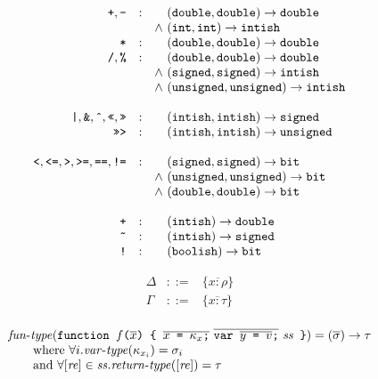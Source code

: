 \documentclass{article}
\newcommand{\funtype}{\mathit{fun}\mbox{-}\mathit{type}}
\newcommand{\vartype}{\mathit{var}\mbox{-}\mathit{type}}
\newcommand{\rettype}{\mathit{return}\mbox{-}\mathit{type}}
\newcommand{\funty}[2]{({#1}) \rightarrow {#2}}
\newcommand{\seq}[1]{\overline{{#1}}}
\newcommand{\mathjs}[1]{\mbox{\texttt{{#1}}}}
\newcommand{\fun}[3]{\mathjs{function }{#1}\mathjs{(}{#2}\mathjs{) \char123{} }{#3}\mathjs{ \char125{}}}
\newcommand{\var}[1]{\mathjs{var }{#1}\mathjs{;}}
\newcommand{\bit}{\mathtt{bit}}
\newcommand{\unsigned}{\mathtt{unsigned}}
\newcommand{\signed}{\mathtt{signed}}
\newcommand{\double}{\mathtt{double}}
\renewcommand{\int}{\mathtt{int}}
\newcommand{\boolish}{\mathtt{boolish}}
\newcommand{\intish}{\mathtt{intish}}
\begin{document}
\[
\begin{array}{rcc@{\ }l}
\mathjs{+}, \mathjs{-}
                 & : &       & \funty{\double, \double}{\double} \\
                 &   & \land & \funty{\int, \int}{\intish} \\
\mathjs{*}       & : &       & \funty{\double, \double}{\double} \\
\mathjs{/}, \mathjs{\%}
                 & : &       & \funty{\double, \double}{\double} \\
                 &   & \land & \funty{\signed, \signed}{\intish}  \\
                 &   & \land & \funty{\unsigned, \unsigned}{\intish} \\
\\
\mathjs{|}, \mathjs{\&}, \mathjs{\^{}}, \mathjs{<<}, \mathjs{>>}
                 & : &       & \funty{\intish, \intish}{\signed} \\
\mathjs{>>>}     & : &       & \funty{\intish, \intish}{\unsigned} \\
\\
\mathjs{<}, \mathjs{<=}, \mathjs{>}, \mathjs{>=}, \mathjs{==}, \mathjs{!=}
                 & : &       & \funty{\signed, \signed}{\bit} \\
                 &   & \land & \funty{\unsigned, \unsigned}{\bit} \\
                 &   & \land & \funty{\double, \double}{\bit} \\
\\
\mathjs{+}       & : &       & \funty{\intish}{\double} \\
\mathjs{\~{}}    & : &       & \funty{\intish}{\signed} \\
\mathjs{!}       & : &       & \funty{\boolish}{\bit} \\
\end{array}
\]

\[
\begin{array}{rcl}
\Delta & ::= & \{ \seq{x : \rho} \} \\
\Gamma & ::= & \{ \seq{x : \tau} \} \\
\end{array}
\]

\[
\begin{array}{l}
\funtype(\fun{f}{\seq{x}}{\seq{x\mathjs{ = }\kappa_x\mathjs{;}}\ \seq{\var{\seq{y\mathjs{ = }v}}}\ \mathit{ss}}) = \funty{\seq{\sigma}}{\tau} \\
\qquad \mbox{where } \forall i . \vartype(\kappa_{x_i}) = \sigma_i \\
\qquad \mbox{and } \forall [\mathit{re}] \in \mathit{ss} . \rettype([\mathit{re}]) = \tau
\end{array}
\]
\end{document}
